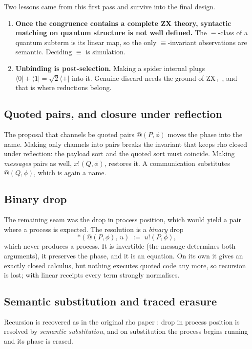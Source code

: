 \documentclass[11pt,a4paper]{article}
\theoremstyle{plain}
\theoremstyle{definition}
\theoremstyle{remark}
\newcommand{\rhoc}{\textsf{rho}}
\newcommand{\bdrop}[2]{{*}(#1,\,#2)}
\newcommand{\scong}{\equiv}
\begin{document}
Two lessons came from this first pass and survive into the final design.
\begin{enumerate}[leftmargin=1.5em]
\item \textbf{Once the congruence contains a complete ZX theory, syntactic
  matching on quantum structure is not well defined.} The $\scong$-class of a
  quantum subterm is its linear map, so the only $\scong$-invariant
  observations are semantic. Deciding $\scong$ is simulation.
\item \textbf{Unbinding is post-selection.} Making a spider internal plugs
  $\langle 0\rvert + \langle 1\rvert = \sqrt2\langle +\rvert$ into it.
  Genuine discard needs the ground of ZX$_{\perp}$ \cite{CJPV}, and that is
  where reductions belong.
\end{enumerate}

\subsection{Quoted pairs, and closure under reflection}

The proposal that channels be quoted pairs $@(P,\phi)$ moves the phase into the
name. Making only channels into pairs breaks the invariant that keeps \rhoc{}
closed under reflection: the payload sort and the quoted sort must coincide.
Making \emph{messages} pairs as well, $x!(Q,\phi)$, restores it. A
communication substitutes $@(Q,\phi)$, which is again a name.

\subsection{Binary drop}

The remaining seam was the drop in process position, which would yield a pair
where a process is expected. The resolution is a \emph{binary} drop
\[
  \bdrop{@(P,\phi)}{u} \;:=\; u!(P,\phi),
\]
which never produces a process. It is invertible (the message determines both
arguments), it preserves the phase, and it is an equation. On its own it gives
an exactly closed calculus, but nothing executes quoted code any more, so
recursion is lost; with linear receipts every term strongly normalises.

\subsection{Semantic substitution and traced erasure}

Recursion is recovered as in the original \rhoc{} paper \cite{MR05}: drop in
process position is resolved by \emph{semantic substitution}, and on
substitution the process begins running and its phase is erased.
\end{document}
